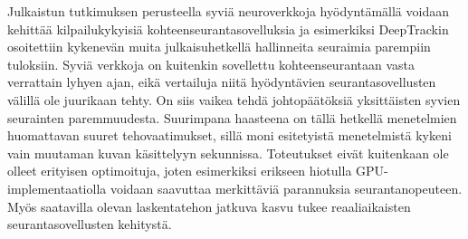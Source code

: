 Julkaistun tutkimuksen perusteella syviä neuroverkkoja hyödyntämällä voidaan kehittää
kilpailukykyisiä kohteenseurantasovelluksia ja esimerkiksi DeepTrackin osoitettiin
kykenevän muita julkaisuhetkellä hallinneita seuraimia parempiin tuloksiin. Syviä
verkkoja on kuitenkin sovellettu kohteenseurantaan vasta verrattain lyhyen ajan, eikä
vertailuja niitä hyödyntävien seurantasovellusten välillä ole juurikaan tehty. On siis
vaikea tehdä johtopäätöksiä yksittäisten syvien seurainten paremmuudesta. Suurimpana
haasteena on tällä hetkellä menetelmien huomattavan suuret tehovaatimukset, sillä
moni esitetyistä menetelmistä kykeni vain muutaman kuvan käsittelyyn sekunnissa.
Toteutukset eivät kuitenkaan ole olleet erityisen optimoituja, joten esimerkiksi
erikseen hiotulla GPU-implementaatiolla voidaan saavuttaa merkittäviä parannuksia
seurantanopeuteen. Myös saatavilla olevan laskentatehon jatkuva kasvu tukee reaaliaikaisten
seurantasovellusten kehitystä.

\renewcommand{\thesubsection}{\oldsubection}
